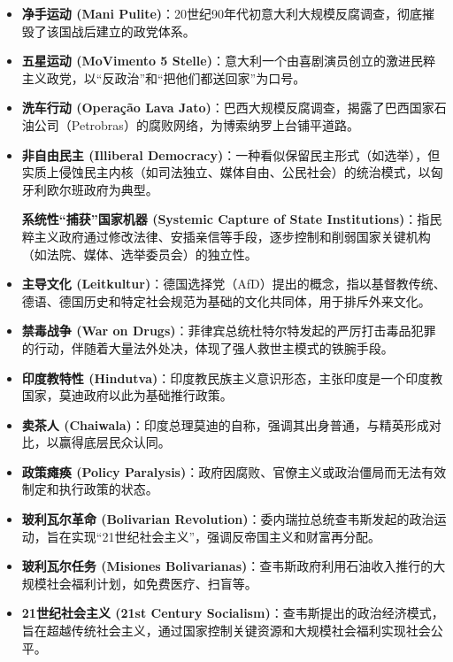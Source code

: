 \begin{itemize}
    \item \textbf{净手运动 (Mani Pulite)}：20世纪90年代初意大利大规模反腐调查，彻底摧毁了该国战后建立的政党体系。

    \item \textbf{五星运动 (MoVimento 5 Stelle)}：意大利一个由喜剧演员创立的激进民粹主义政党，以“反政治”和“把他们都送回家”为口号。

    \item \textbf{洗车行动 (Operação Lava Jato)}：巴西大规模反腐调查，揭露了巴西国家石油公司（Petrobras）的腐败网络，为博索纳罗上台铺平道路。

    \item \textbf{非自由民主 (Illiberal Democracy)}：一种看似保留民主形式（如选举），但实质上侵蚀民主内核（如司法独立、媒体自由、公民社会）的统治模式，以匈牙利欧尔班政府为典型。

    \textbf{系统性“捕获”国家机器 (Systemic Capture of State Institutions)}：指民粹主义政府通过修改法律、安插亲信等手段，逐步控制和削弱国家关键机构（如法院、媒体、选举委员会）的独立性。

    \item \textbf{主导文化 (Leitkultur)}：德国选择党（AfD）提出的概念，指以基督教传统、德语、德国历史和特定社会规范为基础的文化共同体，用于排斥外来文化。

    \item \textbf{禁毒战争 (War on Drugs)}：菲律宾总统杜特尔特发起的严厉打击毒品犯罪的行动，伴随着大量法外处决，体现了强人救世主模式的铁腕手段。

    \item \textbf{印度教特性 (Hindutva)}：印度教民族主义意识形态，主张印度是一个印度教国家，莫迪政府以此为基础推行政策。

    \item \textbf{卖茶人 (Chaiwala)}：印度总理莫迪的自称，强调其出身普通，与精英形成对比，以赢得底层民众认同。

    \item \textbf{政策瘫痪 (Policy Paralysis)}：政府因腐败、官僚主义或政治僵局而无法有效制定和执行政策的状态。

    \item \textbf{玻利瓦尔革命 (Bolivarian Revolution)}：委内瑞拉总统查韦斯发起的政治运动，旨在实现“21世纪社会主义”，强调反帝国主义和财富再分配。

    \item \textbf{玻利瓦尔任务 (Misiones Bolivarianas)}：查韦斯政府利用石油收入推行的大规模社会福利计划，如免费医疗、扫盲等。

    \item \textbf{21世纪社会主义 (21st Century Socialism)}：查韦斯提出的政治经济模式，旨在超越传统社会主义，通过国家控制关键资源和大规模社会福利实现社会公平。


\end{itemize}
